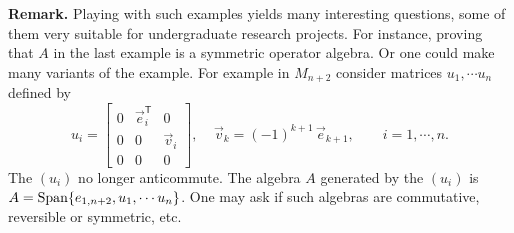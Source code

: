 \documentclass{amsart}
\theoremstyle{remark}
\theoremstyle{definition}
\numberwithin{equation}{section}
\newcommand*{\tran}{\mathsf{T}}
\begin{document}
  
  {\bf Remark.} Playing with such examples yields many interesting questions, some of them very suitable for undergraduate research projects.   For instance, proving that $A$ in the last example  is a symmetric operator algebra.  Or one could make many variants of the example.  For example in $M_{n+2}$ 
 consider matrices $u_1, \cdots u_{n}$ defined by
$$u_{i} = \begin{bmatrix} 0 & \vec e_i^\tran & 0 \\
 0 &   0 & \vec v_i  \\ 0 &    0 &   0  \end{bmatrix} , \; \; \; \;  \vec v_k = (-1)^{k+1} \, \vec e_{k+1},   \qquad i = 1, \cdots , n .$$ 
 The $(u_i)$ no longer anticommute.  The algebra $A$ generated by the $(u_i)$ is $A = {\rm Span} \{ e_{1,n+2} , u_1, \cdots u_{n} \}$.
 One may ask if such algebras are commutative, reversible or symmetric, etc. 
  
\end{document}
